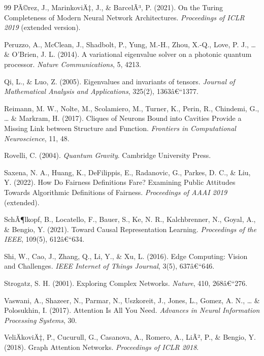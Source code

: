 ﻿\documentclass[12pt,a4paper,twoside]{article}
\theoremstyle{definition}
\theoremstyle{plain}
\theoremstyle{remark}
\begin{document}
\begin{thebibliography}{99}
  PÃ©rez, J., MarinkoviÄ‡, J., \& BarcelÃ³, P. (2021).
  On the Turing Completeness of Modern Neural Network Architectures.
  \textit{Proceedings of ICLR 2019} (extended version).

  Peruzzo, A., McClean, J., Shadbolt, P., Yung, M.-H., Zhou, X.-Q.,
  Love, P. J., \ldots{} \& O'Brien, J. L. (2014).
  A variational eigenvalue solver on a photonic quantum processor.
  \textit{Nature Communications}, 5, 4213.

  Qi, L., \& Luo, Z. (2005).
  Eigenvalues and invariants of tensors.
  \textit{Journal of Mathematical Analysis and Applications}, 325(2), 1363â€“1377.

  Reimann, M. W., Nolte, M., Scolamiero, M., Turner, K., Perin, R.,
  Chindemi, G., \ldots{} \& Markram, H. (2017).
  Cliques of Neurons Bound into Cavities Provide a Missing Link
  between Structure and Function.
  \textit{Frontiers in Computational Neuroscience}, 11, 48.

  Rovelli, C. (2004).
  \textit{Quantum Gravity}.
  Cambridge University Press.

  Saxena, N. A., Huang, K., DeFilippis, E., Radanovic, G.,
  Parkes, D. C., \& Liu, Y. (2022).
  How Do Fairness Definitions Fare? Examining Public Attitudes
  Towards Algorithmic Definitions of Fairness.
  \textit{Proceedings of AAAI 2019} (extended).

  SchÃ¶lkopf, B., Locatello, F., Bauer, S., Ke, N. R., Kalchbrenner, N.,
  Goyal, A., \& Bengio, Y. (2021).
  Toward Causal Representation Learning.
  \textit{Proceedings of the IEEE}, 109(5), 612â€“634.

  Shi, W., Cao, J., Zhang, Q., Li, Y., \& Xu, L. (2016).
  Edge Computing: Vision and Challenges.
  \textit{IEEE Internet of Things Journal}, 3(5), 637â€“646.

  Strogatz, S. H. (2001).
  Exploring Complex Networks.
  \textit{Nature}, 410, 268â€“276.

  Vaswani, A., Shazeer, N., Parmar, N., Uszkoreit, J., Jones, L.,
  Gomez, A. N., \ldots{} \& Polosukhin, I. (2017).
  Attention Is All You Need.
  \textit{Advances in Neural Information Processing Systems}, 30.

  VeliÄkoviÄ‡, P., Cucurull, G., Casanova, A., Romero, A.,
  LiÃ², P., \& Bengio, Y. (2018).
  Graph Attention Networks.
  \textit{Proceedings of ICLR 2018}.


\end{thebibliography}
\end{document}
